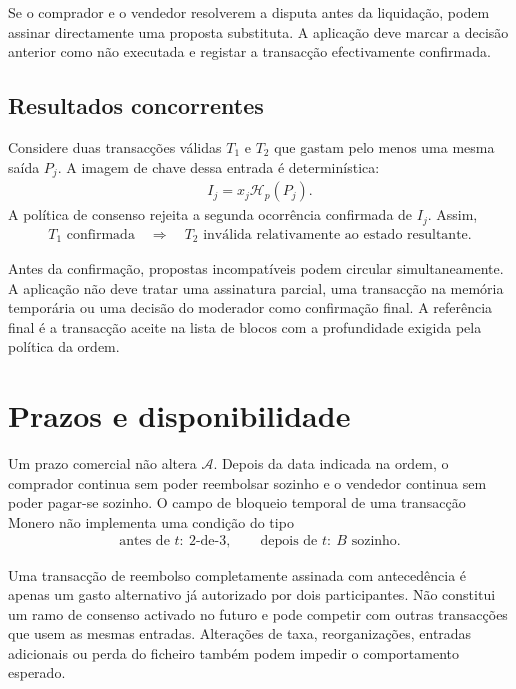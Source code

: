 Se o comprador e o vendedor resolverem a disputa antes da liquidação, podem
assinar directamente uma proposta substituta. A aplicação deve marcar a
decisão anterior como não executada e registar a transacção efectivamente
confirmada.

\subsection{Resultados concorrentes}

Considere duas transacções válidas \(T_1\) e \(T_2\) que gastam pelo menos uma
mesma saída \(P_j\). A imagem de chave dessa entrada é determinística:
\begin{align}
 I_j=x_j\mathcal H_p(P_j).
 \label{eq:escrow-double-spend-image}
\end{align}
A política de consenso rejeita a segunda ocorrência confirmada de \(I_j\).
Assim,
\begin{align}
 T_1\text{ confirmada}
 \quad\Longrightarrow\quad
 T_2\text{ inválida relativamente ao estado resultante}.
 \label{eq:escrow-outcome-exclusion}
\end{align}

Antes da confirmação, propostas incompatíveis podem circular
simultaneamente. A aplicação não deve tratar uma assinatura parcial, uma
transacção na memória temporária ou uma decisão do moderador como confirmação
final. A referência final é a transacção aceite na lista de blocos com a
profundidade exigida pela política da ordem.

\section{Prazos e disponibilidade}
\label{sec:escrow-timeouts}

Um prazo comercial não altera \(\mathcal A\). Depois da data indicada na
ordem, o comprador continua sem poder reembolsar sozinho e o vendedor
continua sem poder pagar-se sozinho. O campo de bloqueio temporal de uma
transacção Monero não implementa uma condição do tipo
\begin{align*}
 \text{antes de }t:\ 2\text{-de-3},
 \qquad
 \text{depois de }t:\ B\text{ sozinho}.
\end{align*}

Uma transacção de reembolso completamente assinada com antecedência é apenas
um gasto alternativo já autorizado por dois participantes. Não constitui um
ramo de consenso activado no futuro e pode competir com outras transacções
que usem as mesmas entradas. Alterações de taxa, reorganizações, entradas
adicionais ou perda do ficheiro também podem impedir o comportamento esperado.

